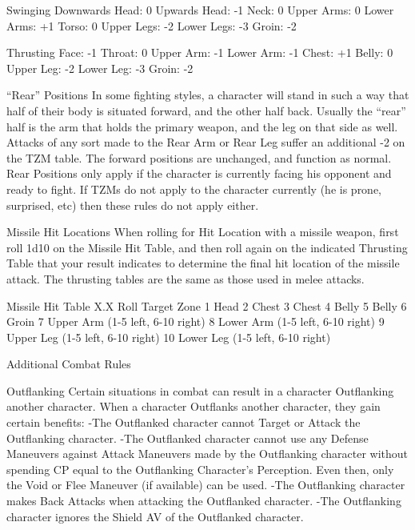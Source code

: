 \documentclass[oneside,11pt,english]{book}
\begin{document}
 

Swinging 
Downwards Head: 0 
Upwards Head: -1 
Neck: 0 
Upper Arms: 0 
Lower Arms: +1 
Torso: 0 
Upper Legs: -2 
Lower Legs: -3 
Groin: -2 

 

Thrusting 
Face: -1 
Throat: 0 
Upper Arm: -1 
Lower Arm: -1 
Chest: +1 
Belly: 0 
Upper Leg: -2 
Lower Leg: -3 
Groin: -2 

 

“Rear” Positions 
In some fighting styles, a character will stand in such a way that half of their body is situated forward, 
and the other half back. Usually the “rear” half is the arm that holds the primary weapon, and the leg on 
that side as well. 
Attacks of any sort made to the Rear Arm or Rear Leg suffer an additional -2 on the TZM table. The 
forward positions are unchanged, and function as normal. 
Rear Positions only apply if the character is currently facing his opponent and ready to fight. If TZMs 
do not apply to the character currently (he is prone, surprised, etc) then these rules do not apply either. 

 

 

Missile Hit Locations 
When rolling for Hit Location with a missile weapon, first roll 1d10 on the Missile Hit Table, and then 
roll again on the indicated Thrusting Table that your result indicates to determine the final hit location of 
the missile attack. The thrusting tables are the same as those used in melee attacks. 

 


Missile Hit Table X.X 
Roll Target Zone 
1 Head 
2 Chest 
3 Chest 
4 Belly 
5 Belly 
6 Groin 
7 Upper Arm (1-5 left, 6-10 right) 
8 Lower Arm (1-5 left, 6-10 right) 
9 Upper Leg (1-5 left, 6-10 right) 
10 Lower Leg (1-5 left, 6-10 right) 

 

 

Additional Combat Rules 

 

Outflanking 
Certain situations in combat can result in a character Outflanking another character. When a character 
Outflanks another character, they gain certain benefits: 
-The Outflanked character cannot Target or Attack the Outflanking character. 
-The Outflanked character cannot use any Defense Maneuvers against Attack Maneuvers made by the 
Outflanking character without spending CP equal to the Outflanking Character’s Perception. Even then, 
only the Void or Flee Maneuver (if available) can be used. 
-The Outflanking character makes Back Attacks when attacking the Outflanked character. 
-The Outflanking character ignores the Shield AV of the Outflanked character. 
\end{document}
